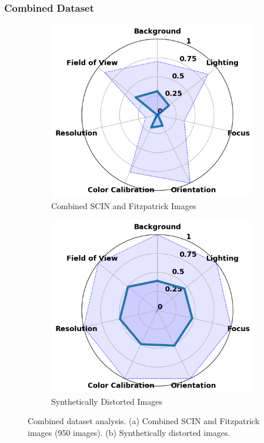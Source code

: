 \subsubsection{Combined Dataset}
\label{subsubsec:CombinedDataset}
\begin{figure}[ht]
    \centering
    \begin{subfigure}[b]{0.48\textwidth}
        \includegraphics[width=\textwidth]{img/hept/combined.png}
        \caption{Combined SCIN and Fitzpatrick Images}
        \label{fig:combined}
    \end{subfigure}
    \hfill
    \begin{subfigure}[b]{0.48\textwidth}
        \includegraphics[width=\textwidth]{img/hept/comb_synthetic.png}
        \caption{Synthetically Distorted Images}
        \label{fig:comb_synthetic}
    \end{subfigure}
    \hfill
    \caption{Combined dataset analysis. (a) Combined SCIN and Fitzpatrick images (950 images). (b) Synthetically distorted images.}
    \label{fig:CF}
\end{figure}
\clearpage
